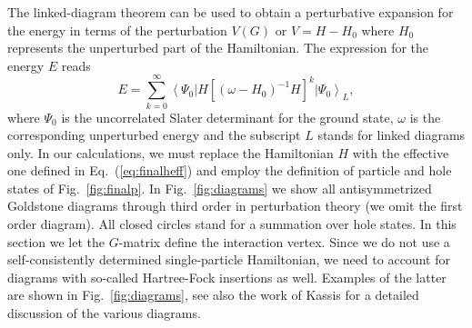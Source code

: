 The linked-diagram theorem \cite{blaizot,lindgren} can be used to obtain a perturbative 
expansion  for the energy
in terms of the perturbation $V(G)$ or  $V=H-H_0$ where $H_0$ represents the unperturbed 
part of the Hamiltonian. The expression for the energy $E$ reads
\begin{equation}
  E = \sum_{k=0}^{\infty} \left\langle \Psi_0 \right| H\left[(\omega - H_0)^{-1}H\right]^k
      \left|\Psi_0\right\rangle_{L},
\end{equation}
where $\Psi_0$ is the uncorrelated Slater determinant for the ground state, $\omega$ is 
the corresponding  
unperturbed  energy and the subscript $L$ stands for linked diagrams only.
In our calculations, we must replace the Hamiltonian $H$ with the effective one defined
in Eq.~(\ref{eq:finalheff}) and employ the definition of particle and hole states
of Fig.~\ref{fig:finalp}.
In Fig.~\ref{fig:diagrams} we show all antisymmetrized Goldstone diagrams through third order
in perturbation theory (we omit the first order diagram). All closed circles stand for a summation
over hole states. In this section we let the  $G$-matrix define the interaction 
vertex. Since we do not use a self-consistently determined single-particle Hamiltonian, we
need to account for diagrams with so-called 
Hartree-Fock insertions as well. Examples of the latter are
shown in Fig.~\ref{fig:diagrams}, see also the work of Kassis \cite{kassis72} for a detailed
discussion of the various diagrams.



